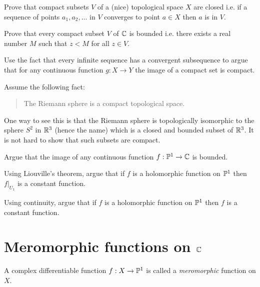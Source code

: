 \documentclass{article}
\begin{document}
    \begin{qbox}
      Prove that compact subsets $V$ of a (nice) topological space $X$ are closed i.e. if a sequence of points $a_1, a_2, \dots $ in $V$ converges to point $a \in X$ then $a$ is in $V$.
    \end{qbox}

    \begin{qbox}
      Prove that every compact subset $V$ of $\mathbb{C}$ is bounded i.e. there exists a real number $M$ such that $z < M$ for all $z \in V$.
    \end{qbox}

    \begin{qbox}
      \label{q:imageOfCompact}
      Use the fact that every infinite sequence has a convergent subsequence to argue that for any continuous function $g: X \rightarrow Y $ the image of a compact set is compact.
    \end{qbox}

    Assume the following fact:
    \begin{quote}
      The Riemann sphere is a compact topological space.
    \end{quote}
    One way to see this is that the Riemann sphere is topologically isomorphic to the sphere $S^2$ in $\mathbb{R}^3$ (hence the name) which is a closed and bounded subset of $\mathbb{R}^3$. It is not hard to show that such subsets are compact.

    \begin{qbox}
      Argue that the image of any continuous function $f: \mathbb{P}^1 \rightarrow \mathbb{C} $ is bounded.
    \end{qbox}

    \begin{qbox}
      Using Liouville's theorem, argue that if $f$ is a holomorphic function on $\mathbb{P}^1$ then $f|_{U_1}$ is a constant function.
    \end{qbox}
    \begin{qbox}
      Using continuity, argue that if $f$ is a holomorphic function on $\mathbb{P}^1$ then $f$ is a constant function.
    \end{qbox}









    \section*{Meromorphic functions on $\mathbb{C}$}
    A complex differentiable function $f: X \rightarrow \mathbb{P}^1$ is called a \emph{meromorphic} function on $X$.
\end{document}

